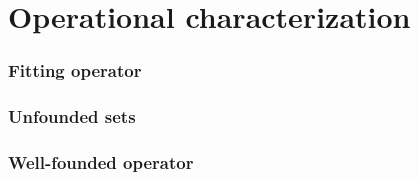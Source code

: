 \part{Operational characterization}


\section{Fitting operator}

\section{Unfounded sets}

\section{Well-founded operator}

%
